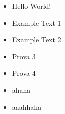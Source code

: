 \documentclass{beamer}
\begin{document}
\begin{frame}
\begin{itemize}[<+->]
    \item Hello World!
    \item Example Text 1
    \item Example Text 2
    \item Prova 3
    \item Prova 4
\end{itemize}
\end{frame}

\begin{frame}
\begin{itemize}
    \item ahaha
    \pause
    \item aaahhaha
    \end{itemize}
\end{frame}
\end{document}
